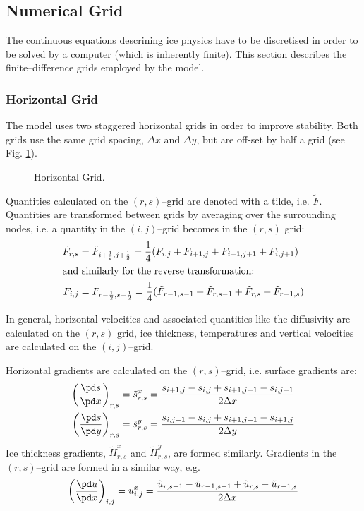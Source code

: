 \subsection{Numerical Grid}
The continuous equations descrining ice physics have to be discretised in order to be solved by a computer (which is inherently finite). This section describes the finite--difference grids employed by the model.
\subsubsection{Horizontal Grid}
The model uses two staggered horizontal grids in order to improve stability. Both grids use the same grid spacing, $\Delta x$ and $\Delta y$, but are off-set by half a grid (see Fig. \ref{kin.fig.grid}). 
\begin{figure}[htbp]
  \begin{center}
    
    \caption{Horizontal Grid.}
    \label{kin.fig.grid}
  \end{center}
\end{figure}
Quantities calculated on the $(r,s)$--grid are denoted with a tilde, i.e. $\tilde{F}$. Quantities are transformed between grids by averaging over the surrounding nodes, i.e. a quantity in the $(i,j)$--grid becomes in the $(r,s)$ grid:
\begin{subequations}
  \begin{align}
    \tilde{F}_{r,s}&=\tilde{F}_{i+\frac12,j+\frac12}=\frac14(F_{i,j}+F_{i+1,j}+F_{i+1,j+1}+F_{i,j+1})\\
    \intertext{and similarly for the reverse transformation:}
    F_{i,j}&=F_{r-\frac12,s-\frac12}=\frac14(\tilde{F}_{r-1,s-1}+\tilde{F}_{r,s-1}+\tilde{F}_{r,s}+\tilde{F}_{r-1,s})
  \end{align}
\end{subequations}

In general, horizontal velocities and associated quantities like the diffusivity are calculated on the $(r,s)$ grid, ice thickness, temperatures and vertical velocities are calculated on the $(i,j)$--grid.

Horizontal gradients are calculated on the $(r,s)$--grid, i.e. surface gradients are:
\begin{subequations}
\begin{align}
  \left(\frac{\pd s}{\pd x}\right)_{r,s}=\tilde{s}^x_{r,s}&=\frac{s_{i+1,j}-s_{i,j}+s_{i+1,j+1}-s_{i,j+1}}{2\Delta x}\\
  \left(\frac{\pd s}{\pd y}\right)_{r,s}=\tilde{s}^y_{r,s}&=\frac{s_{i,j+1}-s_{i,j}+s_{i+1,j+1}-s_{i+1,j}}{2\Delta y}
\end{align}  
\end{subequations}
Ice thickness gradients, $\tilde{H}^x_{r,s}$ and $\tilde{H}^y_{r,s}$, are formed similarly. Gradients in the $(r,s)$--grid are formed in a similar way, e.g. 
\begin{equation}
  \left(\frac{\pd u}{\pd x}\right)_{i,j}=u^x_{i,j}=\frac{\tilde{u}_{r,s-1}-\tilde{u}_{r-1,s-1}+\tilde{u}_{r,s}-\tilde{u}_{r-1,s}}{2\Delta x}
\end{equation}

